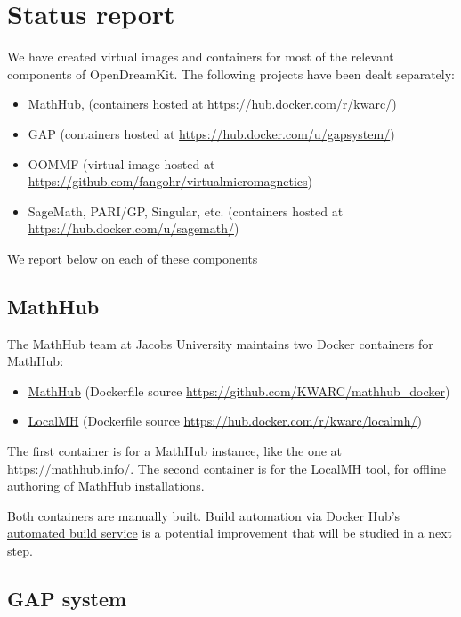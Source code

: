 \section{Status report}\label{status-report}

We have created virtual images and containers for most of the relevant
components of OpenDreamKit. The following projects have been dealt
separately:

\begin{itemize}
\tightlist
\item
  MathHub, (containers hosted at \url{https://hub.docker.com/r/kwarc/})
\item
  GAP (containers hosted at \url{https://hub.docker.com/u/gapsystem/})
\item
  OOMMF (virtual image hosted at
  \url{https://github.com/fangohr/virtualmicromagnetics})
\item
  SageMath, PARI/GP, Singular, etc. (containers hosted at
  \url{https://hub.docker.com/u/sagemath/})
\end{itemize}

We report below on each of these components

\subsection{MathHub}\label{mathhub}

The MathHub team at Jacobs University maintains two Docker containers
for MathHub:

\begin{itemize}
\tightlist
\item
  \href{https://hub.docker.com/r/kwarc/mathhub/}{MathHub} (Dockerfile
  source \url{https://github.com/KWARC/mathhub_docker})
\item
  \href{https://hub.docker.com/r/kwarc/localmh/}{LocalMH} (Dockerfile
  source \url{https://hub.docker.com/r/kwarc/localmh/})
\end{itemize}

The first container is for a MathHub instance, like the one at
\url{https://mathhub.info/}. The second container is for the LocalMH
tool, for offline authoring of MathHub installations.

Both containers are manually built. Build automation via Docker Hub's
\href{https://docs.docker.com/docker-hub/builds/}{automated build
service} is a potential improvement that will be studied in a next step.

\subsection{GAP system}\label{gap-system}


